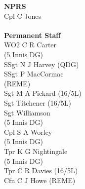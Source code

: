 \begin{multicols}{4}
  \textbf{NPRS} \\
  Cpl C Jones \\
  \\
  \textbf{Permanent Staff} \\
  WO2 C R Carter \\ \indent (5 Innis DG) \\
  SSgt N J Harvey (QDG) \\
  SSgt P MacCormac \\ \indent (REME) \\
  Sgt M A Pickard (16/5L) \\
  Sgt Titchener (16/5L) \\
  Sgt Williamson \\ \indent (5 Innis DG) \\
  Cpl S A Worley \\ \indent (5 Innis DG) \\
  Tpr K G Nightingale \\ \indent (5 Innis DG) \\
  Tpr C R Davies (16/5L) \\
  Cfn C J Howe (REME)
\end{multicols}

\pagebreak
